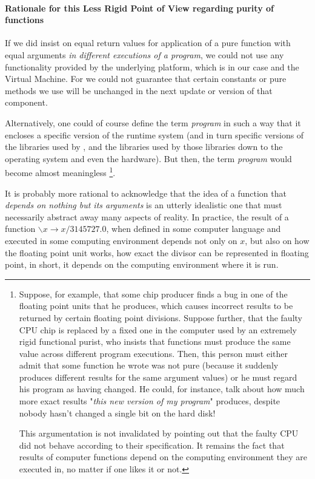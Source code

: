 \begin{description}
\paragraph*{Rationale for this Less Rigid Point of View regarding purity of functions} 
If we did insist on equal return values for application of a pure function with equal arguments \emph{in different executions of a program}, we could not use any functionality provided by the underlying platform, which is in our case \java{} and the \java{} Virtual Machine. For we could not guarantee that certain constants or pure methods we use will be unchanged in the next update or version of that component. 

Alternatively, one could of course define the term \emph{program} in such a way that it encloses a specific version of the \java{} runtime system (and in turn specific versions of the libraries used by \java{}, and the libraries used by those libraries down to the operating system and even the hardware). But then, the term \emph{program} would become almost meaningless
\footnote{Suppose, for example, that some chip producer finds a bug in one of the floating point units that he produces, which causes incorrect results to be returned by certain floating point divisions. Suppose further, that the faulty CPU chip is replaced by a fixed one in the computer used by an extremely rigid functional purist, who insists that functions must produce the same value across different program executions. Then, this person must either admit that some function he wrote was not pure (because it suddenly produces different results for the same argument values) or he must regard his program as having changed. He could, for instance, talk about how much more exact results "\emph{this new version of my program}"  produces, despite nobody hasn't changed a single bit on the hard disk!

This argumentation is not invalidated by pointing out that the faulty CPU did not behave according to their specification. It remains the fact that results of computer functions depend on the computing environment they are executed in, no matter if one likes it or not.
}.

It is probably more rational to acknowledge that the idea of a function that \emph{depends on nothing but its arguments} is an utterly idealistic one that must necessarily abstract away many aspects of reality. In practice, the result of a function $\backslash x \rightarrow x/3145727.0$, when defined in some computer language and executed in some computing environment depends not only on $x$, but also on how the floating point unit works, how exact the divisor can be represented in floating point, in short, it depends on the computing environment where it is run. 


\end{description}
